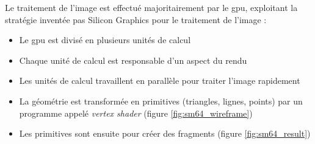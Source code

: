     Le traitement de l'image est effectué majoritairement par le \gls{gpu},
    exploitant la stratégie inventée pas Silicon Graphics\cite{silicon_graphics}
    pour le traitement de l'image :
    \begin{itemize}
        \item Le \Gls{gpu} est divisé en plusieurs unités de calcul
        \item Chaque unité de calcul est responsable d'un aspect du rendu
        \item Les unités de calcul travaillent en parallèle pour traiter
        l'image rapidement
        \item La géométrie est transformée en primitives (triangles, lignes, points) par un programme appelé \emph{\gls{vertex shader}} (figure \ref{fig:sm64_wireframe})
        \item Les primitives sont ensuite  pour créer des \glspl{fragment} (figure \ref{fig:sm64_result})
    \end{itemize}

